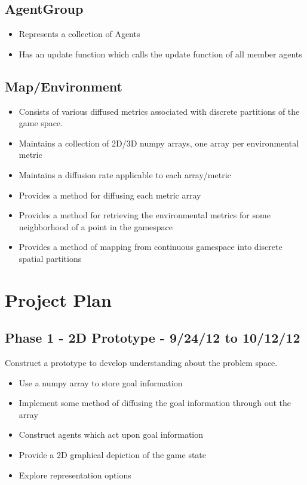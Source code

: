 \documentclass{article}
\begin{document}
\subsection{AgentGroup}
	\begin{itemize}
		\item Represents a collection of Agents
		\item Has an update function which calls the update function of all member agents
	\end{itemize}

\subsection{Map/Environment}
	\begin{itemize}
		\item Consists of various diffused metrics associated with discrete partitions of the game space.
		\item Maintains a collection of 2D/3D numpy arrays, one array per environmental metric
		\item Maintains a diffusion rate applicable to each array/metric
		\item Provides a method for diffusing each metric array
		\item Provides a method for retrieving the environmental metrics for some neighborhood of a point in the gamespace
		\item Provides a method of mapping from continuous gamespace into discrete spatial partitions
	\end{itemize}


\section{Project Plan}
\subsection{Phase 1 - 2D Prototype - 9/24/12 to 10/12/12}
Construct a prototype to develop understanding about the problem space.
\begin{itemize}
	\item Use a numpy array to store goal information
	\item Implement some method of diffusing the goal information through out the array
	\item Construct agents which act upon goal information
	\item Provide a 2D graphical depiction of the game state
	\item Explore representation options
\end{itemize}
\end{document}
